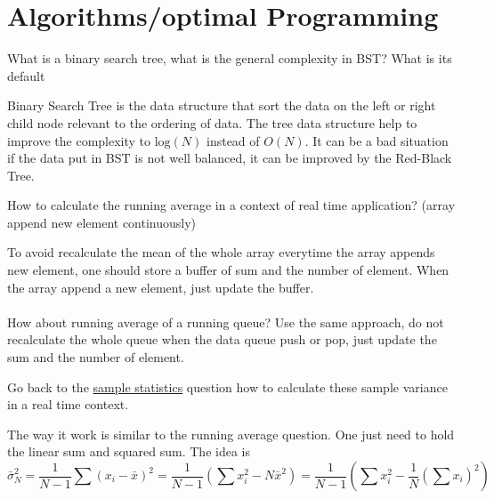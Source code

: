 \documentclass[answers]{exam}
\newcommand*{\ANCOAALGO}{}%
\begin{document}
\ifdefined\ANCOAALGO
\newpage
\section{Algorithms/optimal Programming}
\renewcommand{\questionlabel}{Opt.~\thequestion ]}
\begin{questions}

\question What is a binary search tree, what is the general complexity in BST? What is its default
\begin{solution}[.2in]
Binary Search Tree is the data structure that sort the data on the left or right child node relevant to the ordering of data. The tree data structure help to improve the complexity to $\text{log}(N)$ instead of $O(N)$. It can be a bad situation if the data put in BST is not well balanced, it can be improved by the Red-Black Tree.
\end{solution}

\question How to calculate the running average in a context of real time application? (array append new element continuously)
\begin{solution}[.2in]
	To avoid recalculate the mean of the whole array everytime the array appends new element, one should store a buffer of sum and the number of element. When the array append a new element, just update the buffer.
	\paragraph{} How about running average of a running queue? Use the same approach, do not recalculate the whole queue when the data queue push or pop, just update the sum and the number of element.
\end{solution}

\question Go back to the  \hyperref[stat:sample_stat]{sample statistics} question how to calculate these sample variance in a real time context.
\begin{solution}[.2in]
The way it work is similar to the running average question. One just need to hold the linear sum and squared sum. The idea is 
\[
\bar{\sigma}_{N}^2 
=
\frac{1}{N-1} \sum(x_i - \bar{x})^2
=
\frac{1}{N-1}(\sum x_i^2 - N\bar{x}^2)
=
\frac{1}{N-1}(\sum x_i^2 - \frac{1}{N}(\sum x_i)^2)
\]
\end{solution}


\end{questions}
\end{document}
